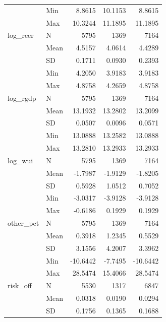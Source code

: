 \documentclass[10pt]{article}
\begin{document}
\begin{longtable}{l l r r r}
                & Min   &     8.8615 &    10.1153 &     8.8615\\
                & Max   &    10.3244 &    11.1895 &    11.1895\\
\addlinespace
log\_reer       & N     &       5795 &       1369 &       7164\\
                & Mean  &     4.5157 &     4.0614 &     4.4289\\
                & SD    &     0.1711 &     0.0930 &     0.2393\\
                & Min   &     4.2050 &     3.9183 &     3.9183\\
                & Max   &     4.8758 &     4.2659 &     4.8758\\
\addlinespace
log\_rgdp       & N     &       5795 &       1369 &       7164\\
                & Mean  &    13.1932 &    13.2802 &    13.2099\\
                & SD    &     0.0507 &     0.0096 &     0.0571\\
                & Min   &    13.0888 &    13.2582 &    13.0888\\
                & Max   &    13.2810 &    13.2933 &    13.2933\\
\addlinespace
log\_wui        & N     &       5795 &       1369 &       7164\\
                & Mean  &    -1.7987 &    -1.9129 &    -1.8205\\
                & SD    &     0.5928 &     1.0512 &     0.7052\\
                & Min   &    -3.0317 &    -3.9128 &    -3.9128\\
                & Max   &    -0.6186 &     0.1929 &     0.1929\\
\addlinespace
other\_pct      & N     &       5795 &       1369 &       7164\\
                & Mean  &     0.3918 &     1.2345 &     0.5529\\
                & SD    &     3.1556 &     4.2007 &     3.3962\\
                & Min   &   -10.6442 &    -7.7495 &   -10.6442\\
                & Max   &    28.5474 &    15.4066 &    28.5474\\
\addlinespace
risk\_off       & N     &       5530 &       1317 &       6847\\
                & Mean  &     0.0318 &     0.0190 &     0.0294\\
                & SD    &     0.1756 &     0.1365 &     0.1688\\

\end{longtable}
\end{document}
